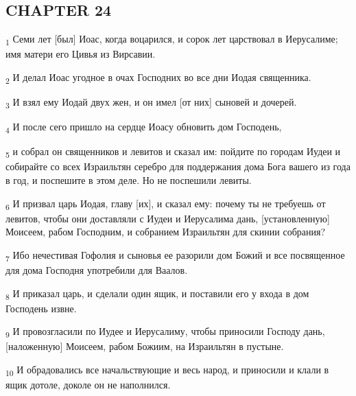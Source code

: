 \subsection{CHAPTER 24}
\begin{tcolorbox}
\textsubscript{1} Семи лет [был] Иоас, когда воцарился, и сорок лет царствовал в Иерусалиме; имя матери его Цивья из Вирсавии.
\end{tcolorbox}
\begin{tcolorbox}
\textsubscript{2} И делал Иоас угодное в очах Господних во все дни Иодая священника.
\end{tcolorbox}
\begin{tcolorbox}
\textsubscript{3} И взял ему Иодай двух жен, и он имел [от них] сыновей и дочерей.
\end{tcolorbox}
\begin{tcolorbox}
\textsubscript{4} И после сего пришло на сердце Иоасу обновить дом Господень,
\end{tcolorbox}
\begin{tcolorbox}
\textsubscript{5} и собрал он священников и левитов и сказал им: пойдите по городам Иудеи и собирайте со всех Израильтян серебро для поддержания дома Бога вашего из года в год, и поспешите в этом деле. Но не поспешили левиты.
\end{tcolorbox}
\begin{tcolorbox}
\textsubscript{6} И призвал царь Иодая, главу [их], и сказал ему: почему ты не требуешь от левитов, чтобы они доставляли с Иудеи и Иерусалима дань, [установленную] Моисеем, рабом Господним, и собранием Израильтян для скинии собрания?
\end{tcolorbox}
\begin{tcolorbox}
\textsubscript{7} Ибо нечестивая Гофолия и сыновья ее разорили дом Божий и все посвященное для дома Господня употребили для Ваалов.
\end{tcolorbox}
\begin{tcolorbox}
\textsubscript{8} И приказал царь, и сделали один ящик, и поставили его у входа в дом Господень извне.
\end{tcolorbox}
\begin{tcolorbox}
\textsubscript{9} И провозгласили по Иудее и Иерусалиму, чтобы приносили Господу дань, [наложенную] Моисеем, рабом Божиим, на Израильтян в пустыне.
\end{tcolorbox}
\begin{tcolorbox}
\textsubscript{10} И обрадовались все начальствующие и весь народ, и приносили и клали в ящик дотоле, доколе он не наполнился.
\end{tcolorbox}
